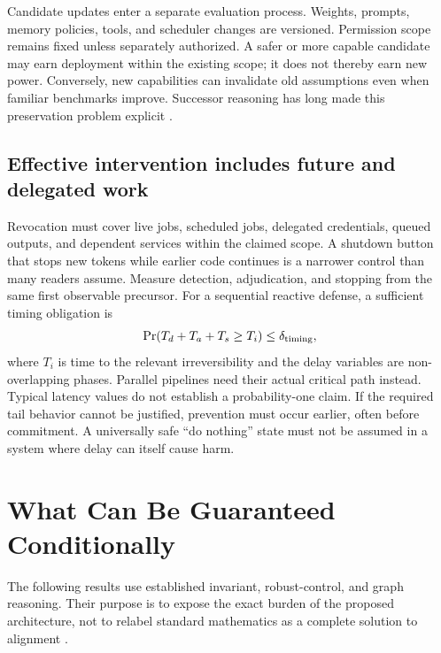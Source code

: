 \documentclass[10pt,twocolumn,letterpaper]{article}
\begin{document}
Candidate updates enter a separate evaluation process. Weights, prompts, memory policies, tools, and scheduler changes are versioned. Permission scope remains fixed unless separately authorized. A safer or more capable candidate may earn deployment within the existing scope; it does not thereby earn new power. Conversely, new capabilities can invalidate old assumptions even when familiar benchmarks improve. Successor reasoning has long made this preservation problem explicit \cite{vingean}.

\subsection{Effective intervention includes future and delegated work}
Revocation must cover live jobs, scheduled jobs, delegated credentials, queued outputs, and dependent services within the claimed scope. A shutdown button that stops new tokens while earlier code continues is a narrower control than many readers assume. Measure detection, adjudication, and stopping from the same first observable precursor. For a sequential reactive defense, a sufficient timing obligation is
\begin{equation}
\Pr(T_d+T_a+T_s\geq T_i)\leq\delta_{\rm timing},
\label{eq:timing}
\end{equation}
where $T_i$ is time to the relevant irreversibility and the delay variables are non-overlapping phases. Parallel pipelines need their actual critical path instead. Typical latency values do not establish a probability-one claim. If the required tail behavior cannot be justified, prevention must occur earlier, often before commitment. A universally safe ``do nothing'' state must not be assumed in a system where delay can itself cause harm.

\section{What Can Be Guaranteed Conditionally}
\label{sec:formal}
The following results use established invariant, robust-control, and graph reasoning. Their purpose is to expose the exact burden of the proposed architecture, not to relabel standard mathematics as a complete solution to alignment \cite{schneider,shield,guaranteed,containment}.
\end{document}
